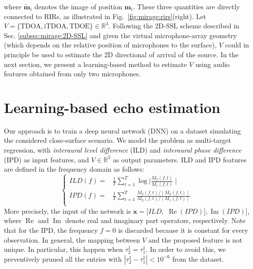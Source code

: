 where $\tilde{\mathbf{m}}_i$ denotes the image of position $\mathbf{m}_i$.
These three quantities are directly connected to RIRs, as illustrated in Fig.~\cref{fig:mirage:rirs}(right).
Let $V = \{ \text{TDOA}, \text{iTDOA}, \text{TDOE}\}\in\mathbb{R}^3$.
Following the 2D-SSL scheme described in Sec. \cref{subsec:mirage:2D-SSL} and
given the virtual microphone-array geometry (which depends on the relative position of microphones to the surface),
$V$ could in principle be used to estimate the 2D directional of arrival of the source.
In the next section, we present a learning-based method to estimate
$V$ using audio features obtained from only two microphones.

\section{Learning-based echo estimation}
Our approach is to train a deep neural network (DNN) on a dataset simulating the considered close-surface scenario.
We model the problem as multi-target regression, with \textit{interaural level difference} (ILD)
and \textit{interaural phase difference} (IPD) as input features, and $V \in \mathbb{R}^3$ as output parameters.
ILD and IPD features are defined in the frequency domain as follows:
\begin{equation}
\label{eq:mirage:features}
\begin{cases}
ILD(f)  =& \tfrac{1}{T} \sum_{t=1}^T \log{\mid \frac{M_2(f,t)}{M_1(f,t)} \mid } \\
IPD(f)  =& \tfrac{1}{T} \sum_{t=1}^T \frac{M_2(f,t)/ \mid M_2(f,t) \mid }{M_2(f,t) / \mid M_1(f,t)  \mid}\\
\end{cases}
\end{equation}
More precisely, the input of the network is
$\mathbf{x} = [ILD,$ $\operatorname{Re}(IPD)], \operatorname{Im}(IPD)]$, where $\operatorname{Re}$
and $\operatorname{Im}$ denote real and imaginary part operators, respectively.
Note that for the IPD, the frequency $f=0$ is discarded because it is constant for every observation.
In general, the mapping between $V$ and the proposed feature is not unique.
In particular, this happen when $\tau_2^1 = \tau_1^1$.
In order to avoid this, we preventively pruned all the entries
with $| \tau_2^1 - \tau_1^1 | < 10^{-6}$ from the dataset.

